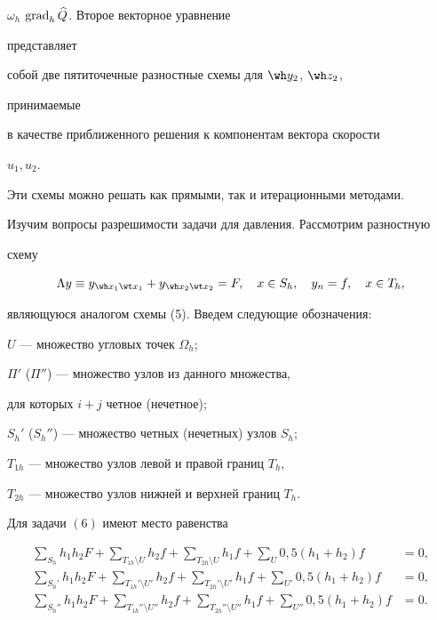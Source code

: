 $\omega_h$\; $\operatorname{grad}_h\widehat Q$. Второе векторное уравнение


представляет


собой две пятиточечные разностные схемы для $\wh y_2$, $\wh z_2$,


принимаемые


в качестве приближенного решения к компонентам вектора скорости


$u_1,u_2$.


Эти схемы можно решать как прямыми, так и итерационными методами.





Изучим вопросы разрешимости задачи для давления. Рассмотрим разностную


схему


\begin{equation}


\Lambda y\equiv y_{\wh x_1\wt x_1}+


y_{\wh x_2\wt x_2}=F,\quad x\in S_h,\quad


y_n=f,\quad x\in T_h,


\end{equation}


являющуюся аналогом схемы (5). Введем следующие обозначения:


$U$ --- множество угловых точек $\Omega_h$;


$\Pi'$ ($\Pi''$) --- множество узлов из данного множества,


для которых $i+j$ четное (нечетное);


$S_h'$ ($S_h''$) --- множество четных (нечетных) узлов $S_h$;


$T_{1h}$ --- множество узлов левой и правой границ $T_h$,


$T_{2h}$ --- множество узлов нижней и верхней границ $T_h$.





\begin{lemnonum}


Для задачи $(6)$ имеют место равенства


\begin{align*}


\sum_{S_h}h_1h_2F+\sum_{T_{1h}\setminus U}h_2f+


\sum_{T_{2h}\setminus U}h_1f+\sum_U0,5(h_1+h_2)f&=0,\\


\sum_{S_h'}h_1h_2F+\sum_{T_{1h}'\setminus U'}h_2f+


\sum_{T_{2h}'\setminus U'}h_1f+\sum_{U'}0,5(h_1+h_2)f&=0,\\


\sum_{S_h''}h_1h_2F+\sum_{T_{1h}''\setminus U''}h_2f+


\sum_{T_{2h}''\setminus U''}h_1f+\sum_{U''}0,5(h_1+h_2)f&=0.


\end{align*}


\end{lemnonum}






